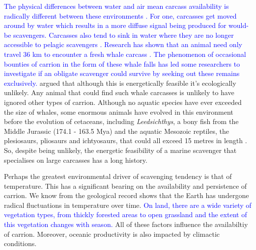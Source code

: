 \documentclass[a4paper,12pt]{article}
\begin{document}
\textcolor{blue}{The physical differences between water and air mean carcass availability is radically different between these environments \citep{beasley2012carrion}. 
For one, carcasses get moved around by water which results in a more diffuse signal being produced for would-be scavengers.
Carcasses also tend to sink in water where they are no longer accessible to pelagic scavengers \citep{beasley2012carrion}. 
\textcolor{blue}{Research has shown that an animal need only travel 36 km to encounter a fresh whale carcass \citep{smith2003ecology}.} 
The phenomenon of occasional bounties of carrion in the form of these whale falls has led some researchers to investigate if an obligate scavenger could survive by seeking out these remains exclusively.}
\cite{ruxton2005searching} argued that although this is energetically feasible it's ecologically unlikely.
Any animal that could find such whale carcasses is unlikely to have ignored other types of carrion.
Although no aquatic species have ever exceeded the size of whales, some enormous animals have evolved in this environment before the evolution of cetaceans, including \textit{Leedsichthys}, a bony fish from the Middle Jurassic (174.1 - 163.5 Mya) and the aquatic Mesozoic reptiles, the plesiosaurs, pliosaurs and ichtyosaurs, that could all exceed 15 metres in length \citep{ruxton2011zoology,danise2014ecological}.
So, despite being unlikely, the energetic feasibility of a marine scavenger that specialises on large carcasses has a long history.

Perhaps the greatest environmental driver of scavenging tendency is that of temperature. 
This has a significant bearing on the availability and persistence of carrion.
We know from the geological record shows that the Earth has undergone radical fluctuations in temperature over time.
\textcolor{blue}{On land, there are a wide variety of vegetation types, from thickly forested areas to open grassland and the extent of this vegetation changes with season.}
All of these factors influence the availabiltiy of carrion.  
Moreover, oceanic productivity is also impacted by climactic conditions.
\end{document}
